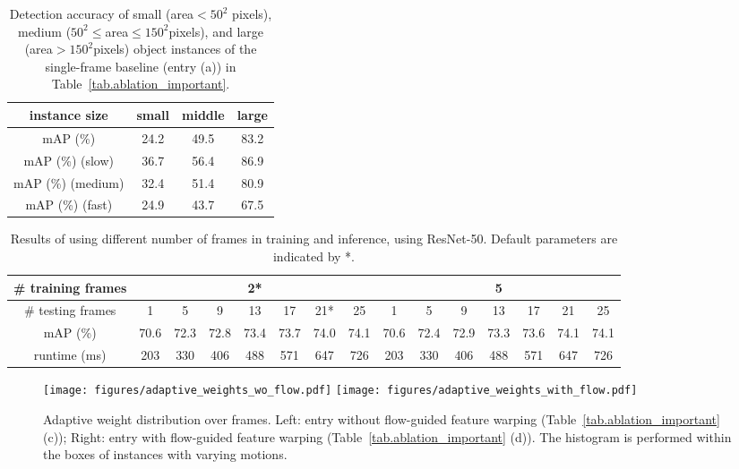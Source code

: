 \documentclass[10pt,twocolumn,letterpaper]{article}
\begin{document}
\setlength{\tabcolsep}{8pt}
\renewcommand{\arraystretch}{1.2}
\begin{table}
\centering
\small
\begin{tabular}{c|c|c|c}
\hline
instance size & small & middle & large\\
\hline \hline
mAP (\%)  & 24.2 & 49.5 & 83.2 \\
\hline
mAP (\%) (slow) & 36.7 & 56.4 & 86.9\\
\hline
mAP (\%) (medium) & 32.4 & 51.4 & 80.9\\
\hline
mAP (\%) (fast)  & 24.9 & 43.7 & 67.5\\
\hline
\end{tabular}
\caption{Detection accuracy of small (area$< 50^2$ pixels), medium ($50^2 \le$area$\le 150^2$pixels), and large (area$>150^2$pixels) object instances of the single-frame baseline (entry (a)) in Table~\ref{tab.ablation_important}.}
\label{tab.ablation_size}
\end{table}

\setlength{\tabcolsep}{4pt}
\renewcommand{\arraystretch}{1.2}
\begin{table*}
\centering
\small
\begin{tabular}{c|c|c|c|c|c|c|c|c|c|c|c|c|c|c}
\hline
 \# training frames & \multicolumn{7}{c|}{ 2*} & \multicolumn{7}{c}{ 5} \\
\hline
\# testing frames & 1 & 5 & 9 & 13 & 17 & 21* & 25 & 1 & 5 & 9 & 13 & 17 & 21 & 25 \\
\hline \hline
mAP (\%) & 70.6 & 72.3 & 72.8 & 73.4 & 73.7 & 74.0 & 74.1 & 70.6 & 72.4 & 72.9 & 73.3 & 73.6 & 74.1 & 74.1\\
\hline
runtime (ms) & 203 & 330 & 406 & 488 & 571 & 647 & 726 & 203 & 330 & 406 & 488 & 571 & 647 & 726 \\
\hline
\end{tabular}
\caption{Results of using different number of frames in training and inference, using ResNet-50. Default parameters are indicated by *.}
\label{tab.ablation_num_frame}
\end{table*}



\begin{figure}
\begin{center}
\texttt{[image: figures/adaptive\_weights\_wo\_flow.pdf]} \texttt{[image: figures/adaptive\_weights\_with\_flow.pdf]} 
\end{center}
\caption{Adaptive weight distribution over frames. Left: entry without flow-guided feature warping (Table~\ref{tab.ablation_important} (c)); Right: entry with flow-guided feature warping (Table~\ref{tab.ablation_important} (d)). The histogram is performed within the boxes of instances with varying motions.}
\label{fig.adaptive_weights}\vspace{-0.5em}
\end{figure}
\end{document}
